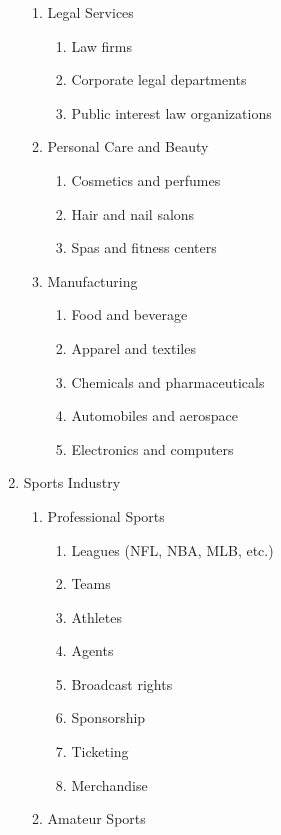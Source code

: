 \begin{enumerate}
\begin{enumerate}
        \item Legal Services
        \begin{enumerate}
            \item Law firms
            \item Corporate legal departments
            \item Public interest law organizations
        \end{enumerate}
        \item Personal Care and Beauty
        \begin{enumerate}
            \item Cosmetics and perfumes
            \item Hair and nail salons
            \item Spas and fitness centers
        \end{enumerate}
        \item Manufacturing
        \begin{enumerate}
            \item Food and beverage
            \item Apparel and textiles
            \item Chemicals and pharmaceuticals
            \item Automobiles and aerospace
            \item Electronics and computers
        \end{enumerate}
    \end{enumerate}
    \item Sports Industry
    \begin{enumerate}
        \item Professional Sports
        \begin{enumerate}
            \item Leagues (NFL, NBA, MLB, etc.)
            \item Teams
            \item Athletes
            \item Agents
            \item Broadcast rights
            \item Sponsorship
            \item Ticketing
            \item Merchandise
        \end{enumerate}
        \item Amateur Sports
        \begin{enumerate}

\end{enumerate}
\end{enumerate}
\end{enumerate}
